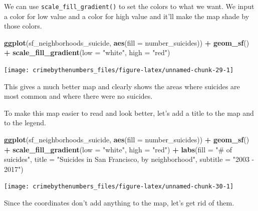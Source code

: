 \documentclass[
  12pt,
]{book}
\newenvironment{Shaded}{\begin{snugshade}}{\end{snugshade}}
\newcommand{\DataTypeTok}[1]{\textcolor[rgb]{0.27,0.27,0.27}{#1}}
\newcommand{\KeywordTok}[1]{\textcolor[rgb]{0.27,0.27,0.27}{\textbf{#1}}}
\newcommand{\NormalTok}[1]{#1}
\newcommand{\OperatorTok}[1]{\textcolor[rgb]{0.43,0.43,0.43}{\textbf{#1}}}
\newcommand{\StringTok}[1]{\textcolor[rgb]{0.5,0.5,0.5}{#1}}
\begin{document}
We can use \texttt{scale\_fill\_gradient()} to set the colors to what we want. We input a color for low value and a color for high value and it'll make the map shade by those colors.

\begin{Shaded}
\begin{Highlighting}[]
\KeywordTok{ggplot}\NormalTok{(sf\_neighborhoods\_suicide, }\KeywordTok{aes}\NormalTok{(}\DataTypeTok{fill =}\NormalTok{ number\_suicides)) }\OperatorTok{+}
\StringTok{  }\KeywordTok{geom\_sf}\NormalTok{() }\OperatorTok{+}
\StringTok{  }\KeywordTok{scale\_fill\_gradient}\NormalTok{(}\DataTypeTok{low =} \StringTok{"white"}\NormalTok{, }\DataTypeTok{high =} \StringTok{"red"}\NormalTok{) }
\end{Highlighting}
\end{Shaded}

\begin{center}\texttt{[image: crimebythenumbers\_files/figure-latex/unnamed-chunk-29-1]} \end{center}

This gives a much better map and clearly shows the areas where suicides are most common and where there were no suicides.

To make this map easier to read and look better, let's add a title to the map and to the legend.

\begin{Shaded}
\begin{Highlighting}[]
\KeywordTok{ggplot}\NormalTok{(sf\_neighborhoods\_suicide, }\KeywordTok{aes}\NormalTok{(}\DataTypeTok{fill =}\NormalTok{ number\_suicides)) }\OperatorTok{+}
\StringTok{  }\KeywordTok{geom\_sf}\NormalTok{() }\OperatorTok{+}
\StringTok{  }\KeywordTok{scale\_fill\_gradient}\NormalTok{(}\DataTypeTok{low =} \StringTok{"white"}\NormalTok{, }\DataTypeTok{high =} \StringTok{"red"}\NormalTok{) }\OperatorTok{+}
\StringTok{  }\KeywordTok{labs}\NormalTok{(}\DataTypeTok{fill =} \StringTok{"\# of suicides"}\NormalTok{,}
       \DataTypeTok{title =} \StringTok{"Suicides in San Francisco, by neighborhood"}\NormalTok{,}
       \DataTypeTok{subtitle =} \StringTok{"2003 {-} 2017"}\NormalTok{) }
\end{Highlighting}
\end{Shaded}

\begin{center}\texttt{[image: crimebythenumbers\_files/figure-latex/unnamed-chunk-30-1]} \end{center}

Since the coordinates don't add anything to the map, let's get rid of them.
\end{document}
